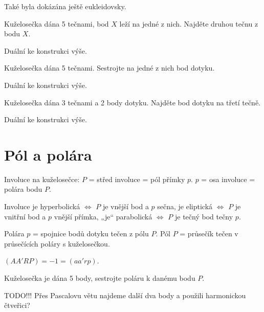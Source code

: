 \documentclass[12pt]{article}					%
\begin{document}
\begin{poznamka}[Historická]
	Také byla dokázána ještě eukleidovsky.
\end{poznamka}

\begin{priklad}[Konstrukce]
	Kuželosečka dána 5 tečnami, bod $X$ leží na jedné z nich. Najděte druhou tečnu z bodu $X$.

	\begin{reseni}
		Duální ke konstrukci výše.
	\end{reseni}
\end{priklad}

\begin{priklad}[Konstrukce]
	Kuželosečka dána 5 tečnami. Sestrojte na jedné z nich bod dotyku.

	\begin{reseni}
		Duální ke konstrukci výše.
	\end{reseni}
\end{priklad}

\begin{priklad}
	Kuželosečka dána 3 tečnami a 2 body dotyku. Najděte bod dotyku na třetí tečně.

	\begin{reseni}
		Duální ke konstrukci výše.
	\end{reseni}
\end{priklad}

\section{Pól a polára}
\begin{poznamka}[Už víme]
	Involuce na kuželosečce: $P$ = střed involuce = pól přímky $p$. $p$ = osa involuce = polára bodu $P$.

	Involuce je hyperbolická $\Leftrightarrow$ $P$ je vnější bod a $p$ sečna, je eliptická $\Leftrightarrow$ $P$ je vnitřní bod a $p$ vnější přímka, „je“ parabolická $\Leftrightarrow$ $P$ je tečný bod tečny $p$.

	Polára $p$ = spojnice bodů dotyku tečen z pólu $P$. Pól $P$ = průsečík tečen v průsečících poláry s kuželosečkou.

	$(AA'RP) = -1 = (aa'rp)$.
\end{poznamka}

\begin{priklad}[Konstrukce]
	Kuželosečka je dána 5 body, sestrojte poláru k danému bodu $P$.

	\begin{reseni}
		TODO!!! Přes Pascalovu větu najdeme další dva body a použili harmonickou čtveřici?
	\end{reseni}
\end{priklad}
\end{document}
